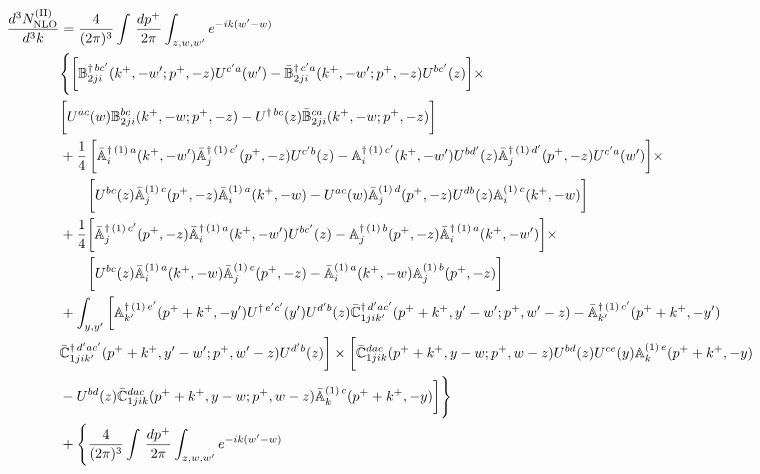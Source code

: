 \documentclass[aps,prd,amsmath,amssymb,nofootinbib]{revtex4-2}
\def\mf#1{\mathbb{#1}}
\numberwithin{equation}{section}
\begin{document}
\begin{align}\label{eq:CS2}
     \frac{d^{3}N_{\rm NLO}^{\rm (II)}}{d^{3}k} & = \frac{4}{(2\pi)^{3}} \int\, \frac{dp^{+}}{2\pi}\int_{z,w,w^{\prime}} e^{-ik(w^{\prime}-w)} \notag \\ & 
    \Bigg\{\bigg[\mf{B}^{\dagger\, bc^{\prime}}_{2ji}(k^{+},-w^{\prime};p^{+},-z)U^{ c^{\prime}a}(w^{\prime}) -\Bar{\mf{B}}^{\dagger\, c^{\prime}a}_{2ji}(k^{+},-w^{\prime}; p^{+},-z)U^{bc^{\prime}}(z)\bigg]\times\notag \\ & \bigg[U^{ac}(w) \mf{B}^{bc}_{2ji}(k^{+},-w;p^{+},-z) -U^{\dagger\, bc}(z)\Bar{\mf{B}}^{ca}_{2ji}(k^{+},-w; p^{+},-z)\bigg]\notag \\ & + \frac{1}{4}\,\bigg[\Bar{\mf{A}}^{\dagger\, (1)\, a}_{i}(k^{+},-w^{\prime})\Bar{\mf{A}}^{\dagger\, (1)\, c^{\prime}}_{j}(p^{+},-z)U^{c^{\prime}b}(z)-\mf{A}^{\dagger\, (1)\, c^{\prime}}_{i}(k^{+},- w^{\prime})U^{bd^{\prime}}(z)\Bar{\mf{A}}^{\dagger\, (1)\, d^{\prime}}_{j}(p^{+},-z)U^{c^{\prime}a}(w^{\prime})  \bigg]\times\notag \\ & \quad \quad\bigg[U^{bc}(z)\Bar{\mf{A}}^{(1)\, c}_{j}(p^{+},-z)\Bar{\mf{A}}^{(1)\, a}_{i}(k^{+},-w)-U^{ac}(w) \Bar{\mf{A}}^{(1)\, d}_{j}(p^{+},-z)U^{db}(z) \mf{A}^{(1)\, c}_{i}(k^{+},- w)\bigg] \notag \\ & +\frac{1}{4}\bigg[\Bar{\mf{A}}^{\dagger\,(1)\, c^{\prime}}_{j}(p^{+},-z)\Bar{\mf{A}}^{\dagger\, (1)\, a}_{i}(k^{+},- w^{\prime})U^{bc^{\prime}}(z) - \mf{A}^{\dagger\, (1)\, b}_{j}(p^{+},- z)\Bar{\mf{A}}^{\dagger\, (1)\, a}_{i}(k^{+},- w^{\prime})\bigg]\times\notag \\ & \quad \quad\bigg[U^{bc}(z)\Bar{\mf{A}}^{(1)\, a}_{i}(k^{+},- w)\Bar{\mf{A}}^{(1)\, c}_{j}(p^{+},-z)-\Bar{\mf{A}}^{(1)\, a}_{i}(k^{+},- w) \mf{A}^{(1)\, b}_{j}(p^{+},- z)\bigg]\notag \\ & + \int_{y,y^{\prime}}\bigg[\mf{A}^{\dagger\, (1)\,e^{\prime}}_{k^{\prime}}(p^{+}+k^{+},-y^{\prime})U^{\dagger\, e^{\prime}c^{\prime}}(y^{\prime})U^{d^{\prime}b}(z) \Bar{\mf{C}}^{\dagger\, d^{\prime}ac^{\prime}}_{1jik^{\prime}}(p^{+}+k^{+},y^{\prime}-w^{\prime}; p^{+},w^{\prime}-z)  -\Bar{\mf{A}}^{\dagger\, (1)\,c^{\prime}}_{k^{\prime}}(p^{+}+k^{+},-y^{\prime})\notag \\ & \Bar{\mf{C}}^{\dagger\, d^{\prime}ac^{\prime}}_{1jik^{\prime}}(p^{+}+k^{+},y^{\prime}-w^{\prime}; p^{+},w^{\prime}-z)U^{d^{\prime}b}(z)\bigg]\times\bigg[\Bar{\mf{C}}^{dac}_{1jik}(p^{+}+k^{+},y-w; p^{+},w-z)U^{bd}(z)U^{ce}(y) \mf{A}^{(1)\,e}_{k}(p^{+}+k^{+},-y)\notag \\ & -U^{bd}(z) \Bar{\mf{C}}^{dac}_{1jik}(p^{+}+k^{+},y-w; p^{+},w-z)\Bar{\mf{A}}^{(1)\,c}_{k}(p^{+}+k^{+},-y)\bigg] \Bigg\}\notag \\ & + \Bigg\{\frac{4}{(2\pi)^{3}} \int\, \frac{dp^{+}}{2\pi}\int_{z,w,w^{\prime}} e^{-ik(w^{\prime}-w)} \notag \\ & 

\end{align}
\end{document}
